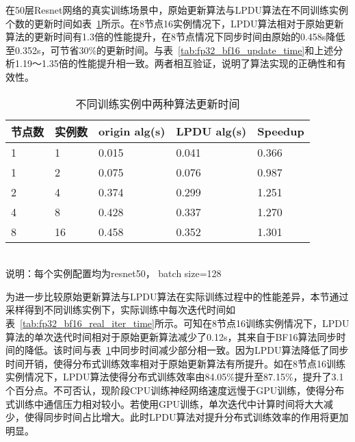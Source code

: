 在50层Resnet网络的真实训练场景中，原始更新算法与LPDU算法在不同训练实例个数的更新时间如表~\ref{tab:fp32_bf16_real_update_time}所示。在8节点16实例情况下，LPDU算法相对于原始更新算法的更新时间有1.3倍的性能提升，在8节点情况下同步时间由原始的0.458s降低至0.352s，可节省30\%的更新时间。与表~\ref{tab:fp32_bf16_update_time}和上述分析1.19～1.35倍的性能提升相一致。两者相互验证，说明了算法实现的正确性和有效性。 

\begin{table}[htbp]
  \centering
  \caption{不同训练实例中两种算法更新时间}
  \label{tab:fp32_bf16_real_update_time}
  \begin{minipage}[t]{0.8\textwidth} 
    \begin{tabularx}{\linewidth}{|l|X|X|X|X|}
      \hline
      节点数 & 实例数 & origin alg(s) & LPDU alg(s) & Speedup\\
      \hline
1 & 1 & 0.015 & 0.041 & 0.366 \\
1 & 2 & 0.075 & 0.076 & 0.987 \\
2 & 4 & 0.374 & 0.299 & 1.251 \\
4 & 8 & 0.428 & 0.337 & 1.270 \\
8 & 16 & 0.458 & 0.352 & 1.301 \\
      \hline
    \end{tabularx}\\[2pt]
    \footnotesize
    说明：每个实例配置均为resnet50， batch size=128\\
  \end{minipage}
\end{table}

为进一步比较原始更新算法与LPDU算法在实际训练过程中的性能差异，本节通过采样得到不同训练实例下，实际训练中每次迭代时间如表~\ref{tab:fp32_bf16_real_iter_time}所示。可知在8节点16训练实例情况下，LPDU算法的单次迭代时间相对于原始更新算法减少了0.12s，其来自于BF16算法同步时间的降低。该时间与表~\ref{tab:fp32_bf16_real_update_time}中同步时间减少部分相一致。因为LPDU算法降低了同步时间开销，使得分布式训练效率相对于原始更新算法有所提升。如在8节点16训练实例情况下，LPDU算法使得分布式训练效率由84.05\%提升至87.15\%，提升了3.1个百分点。不可否认，现阶段CPU训练神经网络速度远慢于GPU训练，使得分布式训练中通信压力相对较小。若使用GPU训练，单次迭代中计算时间将大大减少，使得同步时间占比增大。此时LPDU算法对提升分布式训练效率的作用将更加明显。

